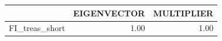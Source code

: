 \begin{tabular}{rrr}
  \hline
 & EIGENVECTOR & MULTIPLIER \\ 
  \hline
FI\_treas\_short & 1.00 & 1.00 \\ 
   \hline
\end{tabular}
